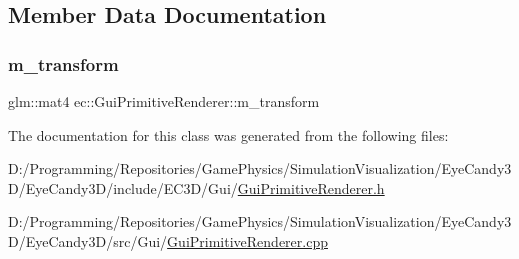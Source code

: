 \subsection{Member Data Documentation}
\mbox{\label{classec_1_1_gui_primitive_renderer_a7ebd149e4d4e0b043d928391041000bf}} 
\subsubsection{\texorpdfstring{m\+\_\+transform}{m\_transform}}
{\footnotesize\ttfamily glm\+::mat4 ec\+::\+Gui\+Primitive\+Renderer\+::m\+\_\+transform\hspace{0.3cm}{\ttfamily [protected]}}



The documentation for this class was generated from the following files\+:\begin{DoxyCompactItemize}
\item 
D\+:/\+Programming/\+Repositories/\+Game\+Physics/\+Simulation\+Visualization/\+Eye\+Candy3\+D/\+Eye\+Candy3\+D/include/\+E\+C3\+D/\+Gui/\mbox{\hyperlink{_gui_primitive_renderer_8h}{Gui\+Primitive\+Renderer.\+h}}\item 
D\+:/\+Programming/\+Repositories/\+Game\+Physics/\+Simulation\+Visualization/\+Eye\+Candy3\+D/\+Eye\+Candy3\+D/src/\+Gui/\mbox{\hyperlink{_gui_primitive_renderer_8cpp}{Gui\+Primitive\+Renderer.\+cpp}}\end{DoxyCompactItemize}
